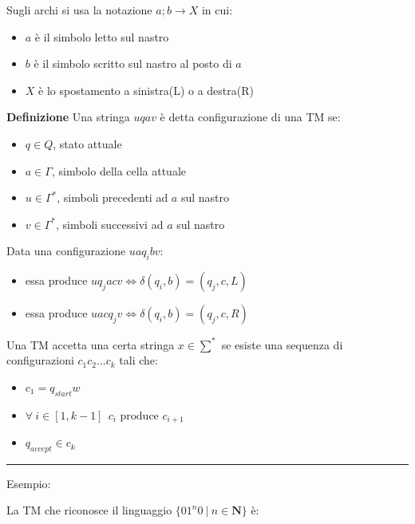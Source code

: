 \documentclass{article}
\begin{document}
\noindent Sugli archi si usa la notazione $a;b\rightarrow X$ in cui:
\begin{itemize}
    \item $a$ è il simbolo letto sul nastro
    \item $b$ è il simbolo scritto sul nastro al posto di $a$
    \item $X$ è lo spostamento a sinistra(L) o a destra(R)\newline
\end{itemize}

\noindent\textbf{Definizione} Una stringa $uqav$ è detta configurazione di una TM se:
\begin{itemize}
    \item $q\in Q$, stato attuale
    \item $a\in \Gamma$, simbolo della cella attuale
    \item $u\in \Gamma^*$, simboli precedenti ad $a$ sul nastro
    \item $v\in \Gamma^*$, simboli successivi ad $a$ sul nastro\newline
\end{itemize}

\noindent Data una configurazione $uaq_ibv$:
\begin{itemize}
    \item essa produce $uq_jacv \iff \delta(q_i,b)=(q_j,c,L)$
    \item essa produce $uacq_jv \iff \delta(q_i,b)=(q_j,c,R)$\newline
\end{itemize}

\noindent Una TM accetta una certa stringa $x\in\sum^*$ se esiste una sequenza di configurazioni $c_1c_2\ldots c_k$ tali che:
\begin{itemize}
    \item $c_1=q_{start}w$
    \item $\forall\ i \in [1,k-1]\ \ c_i \text{ produce } c_{i+1}$ 
    \item $q_{accept}\in c_k$\newline
\end{itemize}

\noindent\rule{\textwidth}{0.5pt}\newline

\noindent Esempio:\newline

\noindent La TM che riconosce il linguaggio $\{01^n0\ |\ n\in\mathbf{N}\}$ è:\newline
\end{document}

